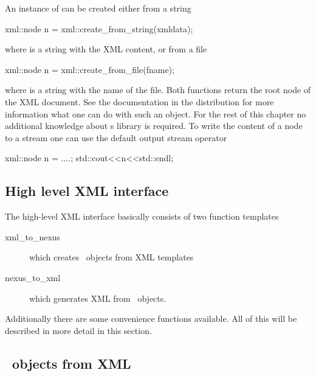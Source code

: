 An instance of  can be created either from a string
\begin{cppcode}
    xml::node n = xml::create_from_string(xmldata);
\end{cppcode}
where  is a string with the XML content, 
or from a file
\begin{cppcode}
    xml::node n = xml::create_from_file(fname);
\end{cppcode}
where  is a string with the name of the file. Both functions 
return the root node of the XML document. See the 
documentation in the  distribution for more information what one can
do with such an object. For the rest of this chapter no additional knowledge
about s  library is required.
To write the content of a node to a stream one can use the default 
output stream operator
\begin{cppcode}
    xml::node n = ....;
    std::cout<<n<<std::endl;
\end{cppcode}


\subsection{High level XML interface}\label{sec:xml:highlevel}

The high-level XML interface basically consists of two function templates 
\begin{description}
\item[xml\_to\_nexus] which creates \nexus\ objects from XML templates
\item[nexus\_to\_xml] which generates XML from \nexus\ objects.
\end{description}
Additionally there are some convenience functions available. All of this will 
be described in more detail in this section.

\subsection{\nexus\ objects from XML}\label{sec:xml::nxtoxml}


